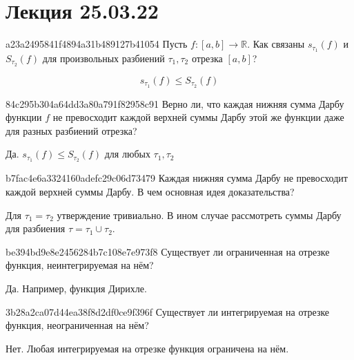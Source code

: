 \section{Лекция 25.03.22}
\begin{note}{a23a2495841f4894a31b489127b41054}
    Пусть \({ f : [a, b] \to \mathbb R }\). Как связаны \({ s_{\tau_1}(f) }\) и \({ S_{\tau_2} (f) }\) для произвольных разбиений \({ \tau_1, \tau_2 }\) отрезка \({ [a, b] }\)?

    \begin{cloze}{1}
        \[
            s_{\tau_1} (f) \leqslant S_{\tau_2} (f)
        \]
    \end{cloze}
\end{note}

\begin{note}{84c295b304a64dd3a80a791f82958c91}
    Верно ли, что каждая нижняя сумма Дарбу функции \({ f }\) не превосходит каждой верхней суммы Дарбу этой же функции даже для разных разбиений отрезка?

    \begin{cloze}{1}
        Да. \({ s_{\tau_1} (f) \leqslant S_{\tau_2} (f) }\) для любых \({ \tau_1, \tau_2 }\)
    \end{cloze}
\end{note}

\begin{note}{b7fac4e6a3324160adefc29c06d73479}
    Каждая нижняя сумма Дарбу не превосходит каждой верхней суммы Дарбу.
    В чем основная идея доказательства?

    \begin{cloze}{1}
        Для \({ \tau_1 = \tau_2 }\) утверждение тривиально. В ином случае рассмотреть суммы Дарбу для разбиения \({ \tau = \tau_1 \cup \tau_2 }\).
    \end{cloze}
\end{note}

\begin{note}{be394bd9e8e2456284b7c108e7e973f8}
    Существует ли ограниченная на отрезке функция, неинтегрируемая на нём?

    \begin{cloze}{1}
        Да. Например, функция Дирихле.
    \end{cloze}
\end{note}

\begin{note}{3b28a2ca07d44ea38f8d2df0ce9f396f}
    Существует ли интегрируемая на отрезке функция, неограниченная на нём?

    \begin{cloze}{1}
        Нет. Любая интегрируемая на отрезке функция ограничена на нём.
    \end{cloze}
\end{note}

